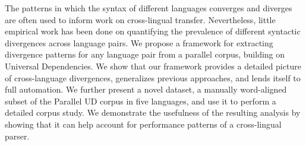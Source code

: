 The patterns in which the syntax of different languages converges and diverges are often used to inform work on cross-lingual transfer. Nevertheless, little empirical work has been done on quantifying the prevalence of different syntactic divergences across language pairs. We propose a framework for extracting divergence patterns for any language pair from a parallel corpus, building on Universal Dependencies. We show that our framework provides a detailed picture of cross-language divergences, generalizes previous approaches, and lends itself to full automation. We further present a novel dataset, a manually word-aligned subset of the Parallel UD corpus in five languages, and use it to perform a detailed corpus study. We demonstrate the usefulness of the resulting analysis by showing that it can help account for performance patterns of a cross-lingual parser.
